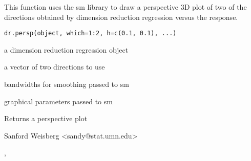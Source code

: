 \begin{Description}\relax
This function uses the sm library to draw a perspective 3D plot of two of
the directions obtained by dimension reduction regression versus the response.\end{Description}
\begin{Usage}
\begin{verbatim}
dr.persp(object, which=1:2, h=c(0.1, 0.1), ...)
\end{verbatim}
\end{Usage}
\begin{Arguments}
\begin{ldescription}
\item[\code{object}] a dimension reduction regression object 
\item[\code{which}] a vector of two directions to use 
\item[\code{h}] bandwidths for smoothing passed to sm 
\item[\code{...}] graphical parameters passed to sm 
\end{ldescription}
\end{Arguments}
\begin{Value}
Returns a perspective plot\end{Value}
\begin{Author}\relax
Sanford Weisberg <sandy@stat.umn.edu>\end{Author}
\begin{SeeAlso}\relax
{}, \end{SeeAlso}
\begin{Examples}
\end{Examples}

